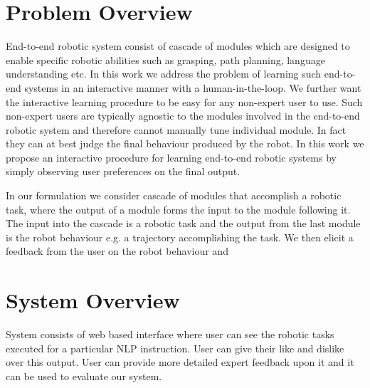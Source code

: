 \section{Problem Overview}

End-to-end robotic system consist of cascade of modules which are designed to enable specific robotic abilities such as grasping, path planning, language understanding etc. In this
work we address the problem of learning such end-to-end systems in an interactive manner with a human-in-the-loop. We further want the interactive learning procedure to be easy for any non-expert user to use. Such non-expert users are typically agnostic to the modules involved in the end-to-end robotic system and therefore cannot manually tune individual module. In fact they can at best judge the final behaviour produced by the robot. In this work we propose an interactive procedure for learning end-to-end robotic systems by simply observing user preferences on the final output.

In our formulation we consider cascade of modules that accomplish a robotic task, where the output of a module forms the input to the module following it. The input into the cascade is a robotic task and the output from the last module is the robot behaviour e.g. a trajectory accomplishing the task. We then elicit a feedback from the user on the robot behaviour and 

\section{System Overview}



System consists of web based interface where user can see the robotic tasks
executed for a particular NLP instruction. User can give their like and dislike
over this output. User can provide more detailed expert feedback upon it and it
can be used to evaluate our system. 


